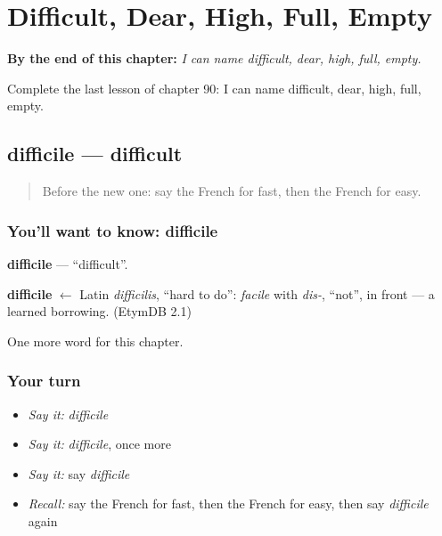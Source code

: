
\chapter{Difficult, Dear, High, Full, Empty}
\label{ch:fr-difficult-dear-high-full-empty}

\begin{chapteropening}
\textbf{By the end of this chapter:} \emph{I can name difficult, dear, high, full, empty.}

Complete the last lesson of chapter 90: I can name difficult, dear, high, full, empty.
\end{chapteropening}

\section[difficile]{difficile — difficult}

\label{lesson:FR-C90-difficile}



\begin{quote}
Before the new one: say the French for fast, then the French for easy.
\end{quote}

\subsection*{You'll want to know: difficile}
\textbf{difficile} — \textquotedblleft{}difficult\textquotedblright{}.

\begin{cousinweb}
\textbf{difficile} $\leftarrow$ Latin \emph{difficilis}, \textquotedblleft{}hard to do\textquotedblright{}: \emph{facile} with \emph{dis-}, \textquotedblleft{}not\textquotedblright{}, in front — a learned borrowing. (EtymDB 2.1)
\end{cousinweb}

\begin{grammarlens}[title={What you've built}]
One more word for this chapter.
\end{grammarlens}

\subsection*{Your turn}
\begin{itemize}
\raggedright
  \item \emph{Say it:} \emph{difficile}
  \item \emph{Say it:} \emph{difficile}, once more
  \item \emph{Say it:} say \emph{difficile}
  \item \emph{Recall:} say the French for fast, then the French for easy, then say \emph{difficile} again
\end{itemize}

